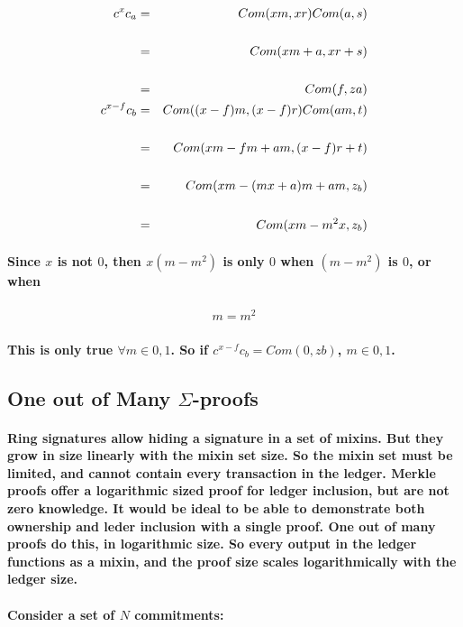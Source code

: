 \documentclass{article}
\begin{document}
\begin{eqnarray}
  c^x c_a &=& Com(xm,xr) Com(a,s)\\
  \cr &=& Com(xm+a, xr+s)\\
  \cr &=& Com(f, za)\\
  c^{x-f} c_b &=& Com((x-f)m, (x-f)r) Com(am, t)\\
  \cr &=& Com(xm - fm + am, (x-f)r + t)\\
  \cr &=& Com(xm - (mx + a)m + am, z_b)\\
  \cr &=& Com(xm - m^2 x, z_b)
\end{eqnarray}

\paragraph{Since $x$ is not $0$, then $x (m-m^2)$ is only $0$ when $(m-m^2)$ is $0$, or when}

\begin{eqnarray}
  m = m^2
\end{eqnarray}

\paragraph{This is only true $\forall m \in {0,1}$.  So if $c^{x-f} c_b = Com(0,zb)$, $m \in {0,1}$.}


\subsection{One out of Many $\Sigma$-proofs}

\paragraph{Ring signatures allow hiding a signature in a set of mixins.  But they grow in size linearly with the mixin set size.  So the mixin set must be limited, and cannot contain every transaction in the ledger.  Merkle proofs offer a logarithmic sized proof for ledger inclusion, but are not zero knowledge.  It would be ideal to be able to demonstrate both ownership and leder inclusion with a single proof.  One out of many proofs do this, in logarithmic size.  So every output in the ledger functions as a mixin, and the proof size scales logarithmically with the ledger size.}

\paragraph{Consider a set of $N$ commitments:}
\end{document}
